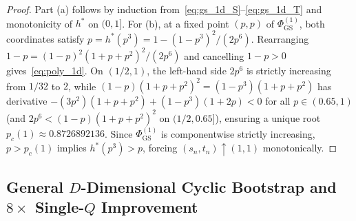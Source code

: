 \documentclass[11pt,a4paper]{article}
\theoremstyle{definition}
\begin{document}
\begin{proof}
Part (a) follows by induction from~\eqref{eq:gs_1d_S}--\eqref{eq:gs_1d_T} and monotonicity of $h^*$ on $(0,1]$. For (b), at a fixed point $(p,p)$ of $\Phi_{\mathrm{GS}}^{(1)}$, both coordinates satisfy $p = h^*(p^3) = 1 - (1-p^3)^2 / (2p^6)$. Rearranging $1-p = (1-p)^2(1+p+p^2)^2/(2p^6)$ and cancelling $1-p > 0$ gives~\eqref{eq:poly_1d}. On $(1/2,1)$, the left-hand side $2p^6$ is strictly increasing from $1/32$ to $2$, while $(1-p)(1+p+p^2)^2 = (1-p^3)(1+p+p^2)$ has derivative $-(3p^2)(1+p+p^2) + (1-p^3)(1+2p) < 0$ for all $p \in (0.65, 1)$ (and $2p^6 < (1-p)(1+p+p^2)^2$ on $(1/2, 0.65]$), ensuring a unique root $p_c(1) \approx 0.8726892136$. Since $\Phi_{\mathrm{GS}}^{(1)}$ is componentwise strictly increasing, $p > p_c(1)$ implies $h^*(p^3) > p$, forcing $(s_n, t_n) \uparrow (1,1)$ monotonically.
\end{proof}

\subsection{General \texorpdfstring{$D$}{D}-Dimensional Cyclic Bootstrap and \texorpdfstring{$8\times$}{8x} Single-\texorpdfstring{$Q$}{Q} Improvement}
\end{document}
